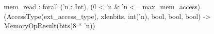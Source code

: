 mem_read : forall ('n : Int), (0 < 'n & 'n <= max_mem_access).
  (AccessType(ext_access_type), xlenbits, int('n), bool, bool, bool) -> MemoryOpResult(bits(8 * 'n))